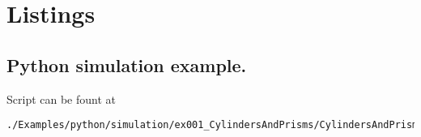 

\chapter{Listings}

%
\section{Python simulation example.} \label{PythonSimulationExampleScript}
Script can be fount at
\begin{lstlisting}[language=shell, style=commandline]
./Examples/python/simulation/ex001_CylindersAndPrisms/CylindersAndPrisms.py
\end{lstlisting}


